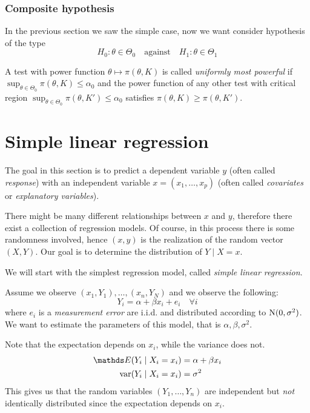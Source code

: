 \documentclass[12pt]{extarticle}
\newcommand{\Normal}{{\operatorfont N}}
\begin{document}
\subsubsection{Composite hypothesis}
In the previous section we saw the simple case, now we want consider hypothesis of the type
\begin{equation}
	H_0: \theta \in \Theta_0 \quad \text{against} \quad H_1 : \theta \in \Theta_1
\end{equation}

A test with power function $\theta \mapsto \pi(\theta, K)$ is called \emph{uniformly most powerful}
if $\sup_{\theta \in \Theta_0} \pi(\theta, K) \leq \alpha_0$ and the power function of any other test
with critical region $\sup_{\theta \in \Theta_0} \pi(\theta, K') \leq \alpha_0$ satisfies
$\pi(\theta, K) \geq \pi(\theta, K')$.

\section{Simple linear regression}

The goal in this section is to predict a dependent variable $y$ (often called \emph{response})
with an independent variable $x = (x_1, \dots, x_p)$
(often called \emph{covariates} or \emph{explanatory variables}).

There might be many different relationships between $x$ and $y$,
therefore there exist a collection of regression models.
Of course, in this process there is some randomness involved, hence $(x, y)$
is the realization of the random vector $(X, Y)$.
Our goal is to determine the distribution of $Y \mid X = x$.

We will start with the simplest regression model, called \emph{simple linear regression}.

Assume we observe $(x_1, Y_1), \dots, (x_n, Y_N)$ and we observe the following:
\begin{equation}
	Y_i = \alpha + \beta x_i + e_i \quad \forall i
\end{equation}
where $e_i$ is a \emph{measurement error} are i.i.d. and distributed according to $\Normal(0, \sigma^2)$.
We want to estimate the parameters of this model, that is $\alpha, \beta, \sigma^2$.

Note that the expectation depends on $x_i$, while the variance does not.
\begin{align}
	\E(Y_i \mid X_i = x_i)   & = \alpha + \beta x_i \\
	\var(Y_i \mid X_i = x_i) & = \sigma^2
\end{align}
This gives us that the random variables $(Y_1, \dots, Y_n)$ are independent
but \emph{not} identically distributed since the expectation depends on $x_i$.
\end{document}

